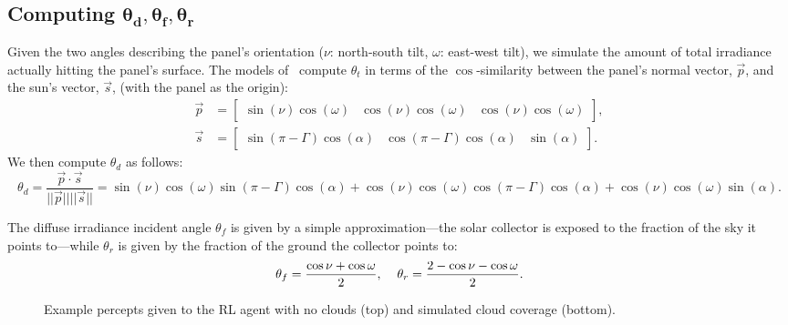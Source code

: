 \documentclass{article}
\begin{document}
{\subsection{Computing $\pmb{\theta_d, \theta_f, \theta_r}$}
Given the two angles describing the panel's orientation ($\nu$: north-south tilt, $\omega$: east-west tilt), we simulate the amount of total irradiance actually hitting the panel's surface. The models of~\citet{masters2013renewable} compute $\theta_t$ in terms of the $\cos$-similarity between the panel's normal vector, $\vec{p}$, and the sun's vector, $\vec{s}$, (with the panel as the origin):
\begin{align*}
\vec{p} &= \begin{bmatrix} \sin(\nu)  \cos(\omega)& \cos(\nu)  \cos(\omega)& \cos(\nu) \cos(\omega) \end{bmatrix}, \\
\vec{s} &= \begin{bmatrix} \sin(\pi - \Gamma)  \cos(\alpha)& \cos(\pi - \Gamma)  \cos(\alpha)& \sin(\alpha) \end{bmatrix}.
\end{align*}
We then compute $\theta_d$ as follows:
\begin{equation}
\theta_d = \frac{\vec{p} \cdot \vec{s}}{||\vec{p}|| ||\vec{s} ||} = \sin(\nu)  \cos(\omega)  \sin(\pi - \Gamma)  \cos(\alpha) + \cos(\nu)  \cos(\omega)  \cos(\pi - \Gamma)  \cos(\alpha) +  \cos(\nu) \cos(\omega)  \sin(\alpha). 
\end{equation}

The diffuse irradiance incident angle $\theta_f$ is given by a simple approximation---the solar collector is exposed to the fraction of the sky it points to---while $\theta_r$ is given by the fraction of the ground the collector points to:
\begin{equation}
\theta_f = \frac{\cos \nu + \cos \omega}{2}, \hspace{4mm} \theta_r = \frac{2 - \cos\nu - \cos \omega}{2}.
\end{equation}

\begin{figure}[t]
\begin{center}
 \hspace{16mm} %
\caption{Example percepts given to the RL agent with no clouds (top) and simulated cloud coverage (bottom).}
\end{center}
\end{figure}


}
\end{document}
